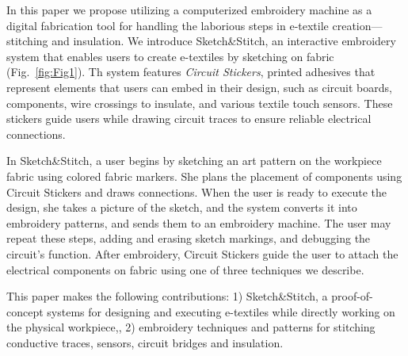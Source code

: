 \documentclass[header.tex]{subfiles}
\begin{document}
In this paper we propose utilizing a computerized embroidery machine as a digital fabrication tool for handling the laborious steps in e-textile creation---stitching and insulation. We introduce Sketch\&Stitch, an interactive embroidery system that enables users to create e-textiles by sketching on fabric (Fig.~\ref{fig:Fig1}). Th system features \textit{Circuit Stickers}, printed adhesives that represent elements that users can embed in their design, such as circuit boards, components, wire crossings to insulate, and various textile touch sensors. These stickers guide users while drawing circuit traces to ensure reliable electrical connections.

In Sketch\&Stitch, a user begins by sketching an art pattern on the workpiece fabric using colored fabric markers. She plans the placement of components using Circuit Stickers and draws connections. When the user is ready to execute the design, she takes a picture of the sketch, and the system converts it into embroidery patterns, and sends them to an embroidery machine. 
The user may repeat these steps, adding and erasing  sketch markings, and debugging the circuit's function.  After embroidery, Circuit Stickers guide the user to attach the electrical components on fabric using one of three techniques we describe.

This paper makes the following contributions: 1) Sketch\&Stitch, a proof-of-concept systems for designing and executing e-textiles while directly working on the physical workpiece,, 2) embroidery techniques and patterns for stitching conductive traces, sensors, circuit bridges and insulation.












\end{document}
